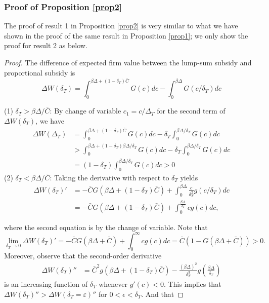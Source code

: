 \documentclass[11pt]{article}
\begin{document}
\subsubsection*{Proof of Proposition \ref{prop2}}
The proof of result 1 in Proposition \ref{prop2} is very similar to 
what we have shown in the proof of the same result in Proposition \ref{prop1}; we only show the proof for result 2 as below.
\begin{proof}
The difference of expected firm value between the lump-sum subsidy and proportional subsidy is 
\begin{equation*}
    \Delta W(\delta_T) = \int_0^{\beta \Delta +(1-\delta_T)\bar{C}}G(c)dc-\int_0^{\beta \Delta}G(c/\delta_T)dc
\end{equation*}

    (1) $\delta_T>\beta \Delta/\bar{C}$: By change of variable $c_1 = c/\Delta_T$ for the second term of $\Delta W(\delta_T)$, we have 
            \begin{align*}
                \Delta W(\Delta_T)
                    & = \int_0^{\beta \Delta +(1-\delta_T)\bar{C}}G(c)dc-\delta_T\int_0^{\beta \Delta/\delta_T}G(c)dc \\ 
                    & > \int_0^{\beta \Delta +(1-\delta_T)\beta \Delta/\delta_T}G(c)dc-\delta_T\int_0^{\beta \Delta/\delta_T}G(c)dc \\
                    & = (1-\delta_T)\int_0^{\beta \Delta/\delta_T}G(c)dc >0
            \end{align*} 
    (2) $\delta_T<\beta \Delta/\bar{C}$: Taking the derivative with respect to $\delta_T$ yields
    \begin{align*}
        \Delta W(\delta_T)' &=-\bar{C}  G\left(\beta \Delta +(1-\delta_T)\bar{C} \right)+\int_0^{\beta \Delta }\frac{c}{\delta_T^2}g(c/\delta_T)dc \\
            &=-\bar{C}  G\left(\beta \Delta +(1-\delta_T)\bar{C} \right)+\int_0^{\frac{\beta\Delta}{\delta_T}}cg(c)dc,    
    \end{align*}

where the second equation is by the change of variable. Note that $$\lim_{\delta_T\rightarrow 0}\Delta W(\delta_T)'=-\bar{C}G(\beta \Delta+\bar{C})+\int_0^{\infty}cg(c)dc=\bar{C}(1-G(\beta \Delta+\bar{C}))>0.$$ Moreover, observe that the second-order derivative 
\begin{align*}
    \Delta W(\delta_T)'' &= \bar{C}^2 g(\beta\Delta+(1-\delta_T)\bar{C})-\frac{(\beta\Delta)^2}{\delta_T^3}g(\frac{\beta \Delta}{\delta_T})
\end{align*}
is an increasing function of $\delta_T$ whenever $g'(c)<0$. This implies that $\Delta W(\delta_T)''>\Delta W(\delta_T=\varepsilon)''$ for $0<\epsilon<\delta_T$. And that 


\end{proof}
\end{document}
